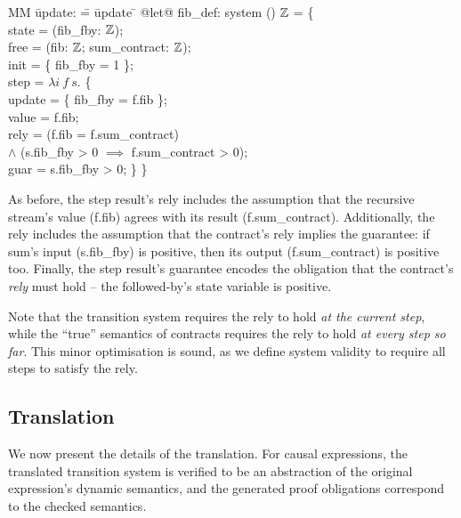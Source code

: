   \begin{tabbing}
  MM \= update: \= = \= update \= \kill
  @let@ fib_def: system () $\mathbb{Z}$ = \{ \\
  \> state   \> = (fib_fby: $\mathbb{Z}$); \\
  \> free  \> = (fib: $\mathbb{Z}$; sum_contract: $\mathbb{Z}$); \\
  \> init  \> = \{ fib_fby = 1 \}; \\
  \> step  \> = $\lambda{} i~f~s.$ \{ \\
  \> \> \> update \> = \{ fib_fby = f.fib \}; \\
  \> \> \> value  \> = f.fib; \\
  \> \> \> rely   \> = (f.fib = f.sum_contract) \\
  \> \> \>        \> $\wedge$ (s.fib_fby > 0 $\implies$ f.sum_contract > 0); \\
  \> \> \> guar   \> = s.fib_fby > 0; \} \}
  \end{tabbing}

As before, the step result's rely includes the assumption that the recursive stream's value (f.fib) agrees with its result (f.sum_contract).
Additionally, the rely includes the assumption that the contract's rely implies the guarantee: if sum's input (s.fib_fby) is positive, then its output (f.sum_contract) is positive too.
Finally, the step result's guarantee encodes the obligation that the contract's \emph{rely} must hold -- the followed-by's state variable is positive.

Note that the transition system requires the rely to hold \emph{at the current step}, while the ``true'' semantics of contracts requires the rely to hold \emph{at every step so far}.
This minor optimisation is sound, as we define system validity to require all steps to satisfy the rely.

\subsection{Translation}

We now present the details of the translation.
For causal expressions, the translated transition system is verified to be an abstraction of the original expression's dynamic semantics, and the generated proof obligations correspond to the checked semantics.


